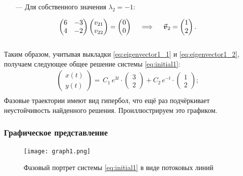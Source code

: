 \documentclass{article}
\begin{document}
\begin{itemize}
    \item[---] Для собственного значения $\lambda_2 = -1$:
\end{itemize}
\begin{equation}
    \begin{pmatrix}
    6 & -3 \\ 4 & -2
    \end{pmatrix}
    \begin{pmatrix}
    v_{21} \\ v_{22}
    \end{pmatrix} = 
    \begin{pmatrix}
    0 \\ 0
    \end{pmatrix} \quad \implies \quad \va*{v}_2 = 
    \begin{pmatrix}
    1 \\ 2
    \end{pmatrix}. \label{eq:eigenvector1_2}
\end{equation}\\[4pt]
Таким образом, учитывая выкладки \ref{eq:eigenvector1_1} и \ref{eq:eigenvector1_2}, получаем следующее общее решение системы \ref{eq:initial1}:
\begin{gather*}
\begin{pmatrix}
x(t) \\ y(t)
\end{pmatrix} = \,C_1\,e^{3t}\cdot 
\begin{pmatrix}
    3 \\ 2
\end{pmatrix} + C_2\,e^{-t}\cdot 
\begin{pmatrix}
    1 \\ 2
\end{pmatrix};\\[3pt]
\end{gather*}
Фазовые траектории имеют вид гипербол, что ещё раз подчёркивает неустойчивость найденного решения. Проиллюстрируем это графиком.
\newpage
\subsubsection{Графическое представление}
\vspace{-0.7cm}
\begin{figure}[h]
    \centering
    \texttt{[image: graph1.png]}
    \caption{Фазовый портрет системы \ref{eq:initial1} в виде потоковых линий}
    \label{fig:stream1_1}
\end{figure}
\newpage
\end{document}
